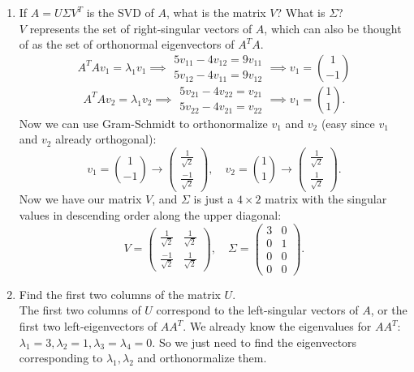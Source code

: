 \documentclass[11pt]{article}
\newcommand{\n}{\vspace{0.3cm}}
\begin{document}
\begin{enumerate}
\begin{enumerate}
	\item If \(A = U \Sigma V^T\) is the SVD of \(A\), what is the matrix \(V\)?  What is \(\Sigma\)? \n\\
	      \(V\) represents the set of right-singular vectors of \(A\), which can also be thought of as the set of orthonormal eigenvectors of \(A^T A\).
	      \[A^T A v_1 = \lambda_1 v_1 \implies \begin{array}{r} 5v_{11} - 4v_{12} = 9v_{11} \\ 5v_{12} - 4 v_{11} = 9v_{12}\end{array} \implies v_1 = \binom1{-1}\]
	      \[A^T A v_2 = \lambda_1 v_2 \implies \begin{array}{r} 5v_{21} - 4v_{22} = v_{21} \\ 5v_{22} - 4 v_{21} = v_{22}\end{array} \implies v_1 = \binom11.\]
	      Now we can use Gram-Schmidt to orthonormalize \(v_1\) and \(v_2\) (easy since \(v_1\) and \(v_2\) already orthogonal):
	      \[
		      v_1 = \binom1{-1} \to
		      \left(\begin{array}{r}\tfrac{1}{\sqrt2} \\ \tfrac{-1}{\sqrt2} \end{array}\right),
		      \quad v_2 = \binom11 \to
		      \left(\begin{array}{r}\tfrac{1}{\sqrt2} \\ \tfrac{1}{\sqrt2} \end{array}\right).
	      \]
        Now we have our matrix \(V\), and \(\Sigma\) is just a \(4 \times 2\) matrix with the singular values in descending order along the upper diagonal:
        \[V = \left(\begin{array}{rr} \tfrac{1}{\sqrt2} & \tfrac{1}{\sqrt2} \\ \tfrac{-1}{\sqrt2} & \tfrac{1}{\sqrt2} \end{array}\right), \quad \Sigma = \left( \begin{array}{rr} 3 & 0 \\ 0 & 1 \\ 0 & 0 \\ 0 & 0 \end{array} \right).\]
	\item Find the first two columns of the matrix \(U\). \n\\
    The first two columns of \(U\) correspond to the left-singular vectors of \(A\), or the first two left-eigenvectors of \(AA^T\).  We already know the eigenvalues for \(AA^T\): \(\lambda_1 = 3, \lambda_2 = 1, \lambda_3 = \lambda_4 = 0\).  So we just need to find the eigenvectors corresponding to \(\lambda_1, \lambda_2\) and orthonormalize them.

\end{enumerate}
\end{enumerate}
\end{document}
